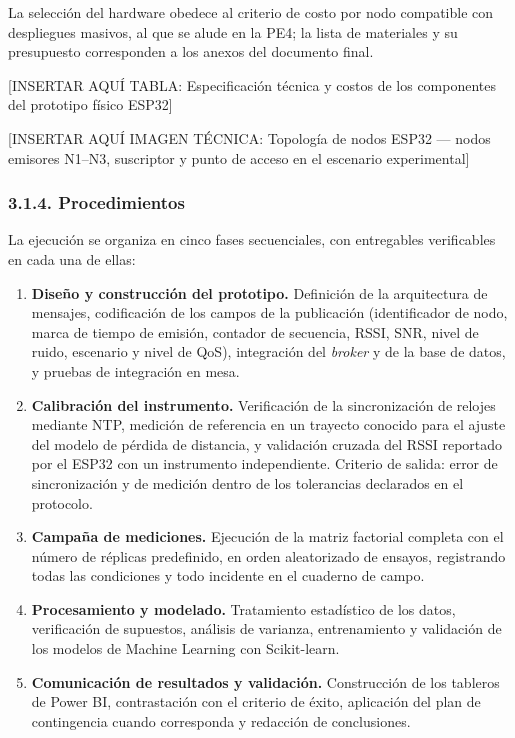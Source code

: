 \documentclass[
  12pt,
]{article}
\providecommand{\tightlist}{%
  \setlength{\itemsep}{0pt}\setlength{\parskip}{0pt}}
\begin{document}
La selección del hardware obedece al criterio de costo por nodo
compatible con despliegues masivos, al que se alude en la PE4; la lista
de materiales y su presupuesto corresponden a los anexos del documento
final.

{[}INSERTAR AQUÍ TABLA: Especificación técnica y costos de los
componentes del prototipo físico ESP32{]}

{[}INSERTAR AQUÍ IMAGEN TÉCNICA: Topología de nodos ESP32 — nodos
emisores N1–N3, suscriptor y punto de acceso en el escenario
experimental{]}

\subsubsection{3.1.4. Procedimientos}\label{procedimientos}

La ejecución se organiza en cinco fases secuenciales, con entregables
verificables en cada una de ellas:

\begin{enumerate}
\def\labelenumi{\arabic{enumi}.}
\tightlist
\item
  \textbf{Diseño y construcción del prototipo.} Definición de la
  arquitectura de mensajes, codificación de los campos de la publicación
  (identificador de nodo, marca de tiempo de emisión, contador de
  secuencia, RSSI, SNR, nivel de ruido, escenario y nivel de QoS),
  integración del \emph{broker} y de la base de datos, y pruebas de
  integración en mesa.
\item
  \textbf{Calibración del instrumento.} Verificación de la
  sincronización de relojes mediante NTP, medición de referencia en un
  trayecto conocido para el ajuste del modelo de pérdida de distancia, y
  validación cruzada del RSSI reportado por el ESP32 con un instrumento
  independiente. Criterio de salida: error de sincronización y de
  medición dentro de los tolerancias declarados en el protocolo.
\item
  \textbf{Campaña de mediciones.} Ejecución de la matriz factorial
  completa con el número de réplicas predefinido, en orden aleatorizado
  de ensayos, registrando todas las condiciones y todo incidente en el
  cuaderno de campo.
\item
  \textbf{Procesamiento y modelado.} Tratamiento estadístico de los
  datos, verificación de supuestos, análisis de varianza, entrenamiento
  y validación de los modelos de Machine Learning con Scikit-learn.
\item
  \textbf{Comunicación de resultados y validación.} Construcción de los
  tableros de Power BI, contrastación con el criterio de éxito,
  aplicación del plan de contingencia cuando corresponda y redacción de
  conclusiones.
\end{enumerate}
\end{document}
